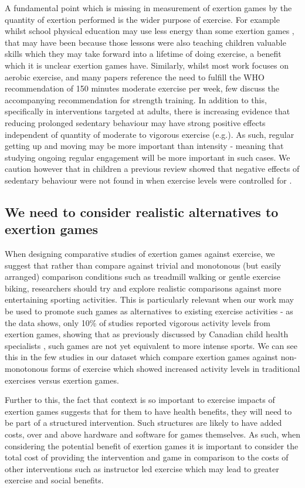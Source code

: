 A fundamental point which is missing in measurement of exertion games by the quantity of exertion performed is the wider purpose of exercise. For example whilst school physical education may use less energy than some exertion games \cite{Gao2015AExergaming}, that may have been because those lessons were also teaching children valuable skills which they may take forward into a lifetime of doing exercise, a benefit which it is unclear exertion games have. Similarly, whilst most work focuses on aerobic exercise, and many papers reference the need to fulfill the WHO recommendation of 150 minutes moderate exercise per week, few discuss the accompanying recommendation for strength training. 
In addition to this, specifically in interventions targeted at adults, there is increasing evidence that reducing prolonged sedentary behaviour may have strong positive effects independent of quantity of moderate to vigorous exercise (e.g.\cite{healy2008objectively}). As such, regular getting up and moving may be more important than intensity - meaning that studying ongoing regular engagement will be more important in such cases. We caution however that in children a previous review showed that negative effects of sedentary behaviour were not found in when exercise levels were controlled for \cite{cliff2016objectively}.

\subsection{We need to consider realistic alternatives to exertion games}

When designing comparative studies of exertion games against exercise, we suggest that rather than compare against trivial and monotonous (but easily arranged) comparison conditions such as treadmill walking or gentle exercise biking, researchers should try and explore realistic comparisons against more entertaining sporting activities. This is particularly relevant when our work may be used to promote such games as alternatives to existing exercise activities - as the data shows, only 10\% of studies reported vigorous activity levels from exertion games, showing that as previously discussed by Canadian child health specialists \cite{Chaput2013ActiveYouth}, such games are not yet equivalent to more intense sports. We can see this in the few studies in our dataset which compare exertion games against non-monotonous forms of exercise \cite{Gao2013ChildrenSDance,Rincker2017TheFitness,Sell2011EnergyActivities} which showed increased activity levels in traditional exercises versus exertion games.

Further to this, the fact that context is so important to exercise impacts of exertion games suggests that for them to have health benefits, they will need to be part of a structured intervention. Such structures are likely to have added costs, over and above hardware and software for games themselves. As such, when considering the potential benefit of exertion games it is important to consider the total cost of providing the intervention and game in comparison to the costs of other interventions such as instructor led exercise which may lead to greater exercise and social benefits.
